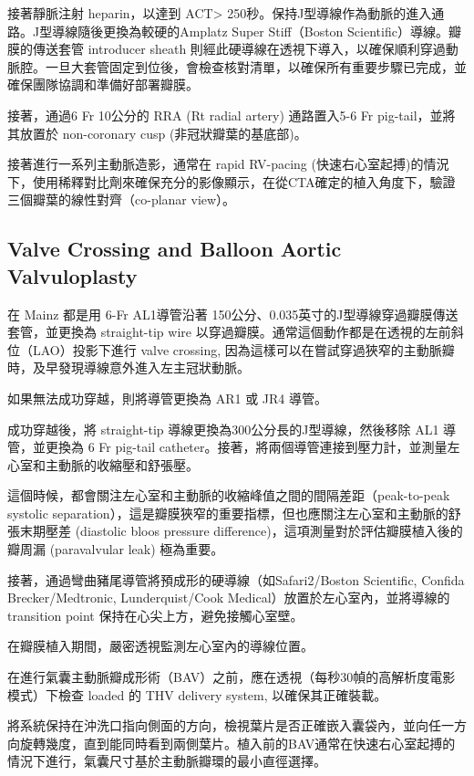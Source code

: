 \documentclass[nols]{tufte-book}
\begin{document}
接著靜脈注射 heparin，以達到 ACT> 250秒。保持J型導線作為動脈的進入通路。J型導線隨後更換為較硬的Amplatz Super Stiff（Boston Scientific）導線。瓣膜的傳送套管 introducer sheath 則經此硬導線在透視下導入，以確保順利穿過動脈腔。一旦大套管固定到位後，會檢查核對清單，以確保所有重要步驟已完成，並確保團隊協調和準備好部署瓣膜。


接著，通過6 Fr 10公分的 RRA (Rt radial artery) 通路置入5-6 Fr pig-tail，並將其放置於 non-coronary cusp (非冠狀瓣葉的基底部)。

接著進行一系列主動脈造影，通常在 rapid RV-pacing (快速右心室起搏)的情況下，使用稀釋對比劑來確保充分的影像顯示，在從CTA確定的植入角度下，驗證三個瓣葉的線性對齊（co-planar view）。

\subsection{Valve Crossing and Balloon Aortic Valvuloplasty}
在 Mainz 都是用 6-Fr AL1導管沿著 150公分、0.035英寸的J型導線穿過瓣膜傳送套管，並更換為 straight-tip wire 以穿過瓣膜。通常這個動作都是在透視的左前斜位（LAO）投影下進行 valve crossing, 因為這樣可以在嘗試穿過狹窄的主動脈瓣時，及早發現導線意外進入左主冠狀動脈。

如果無法成功穿越，則將導管更換為 AR1 或 JR4 導管。

成功穿越後，將 straight-tip 導線更換為300公分長的J型導線，然後移除 AL1 導管，並更換為 6 Fr pig-tail catheter。接著，將兩個導管連接到壓力計，並測量左心室和主動脈的收縮壓和舒張壓。

這個時候，都會關注左心室和主動脈的收縮峰值之間的間隔差距（peak-to-peak systolic separation），這是瓣膜狹窄的重要指標，但也應關注左心室和主動脈的舒張末期壓差 (diastolic bloos pressure difference)，這項測量對於評估瓣膜植入後的瓣周漏 (paravalvular leak) 極為重要。

接著，通過彎曲豬尾導管將預成形的硬導線（如Safari2/Boston Scientific, Confida Brecker/Medtronic, Lunderquist/Cook Medical）放置於左心室內，並將導線的 transition point 保持在心尖上方，避免接觸心室壁。

在瓣膜植入期間，嚴密透視監測左心室內的導線位置。

在進行氣囊主動脈瓣成形術（BAV）之前，應在透視（每秒30幀的高解析度電影模式）下檢查 loaded 的 THV delivery system, 以確保其正確裝載。

將系統保持在沖洗口指向側面的方向，檢視葉片是否正確嵌入囊袋內，並向任一方向旋轉幾度，直到能同時看到兩側葉片。植入前的BAV通常在快速右心室起搏的情況下進行，氣囊尺寸基於主動脈瓣環的最小直徑選擇。
\end{document}
